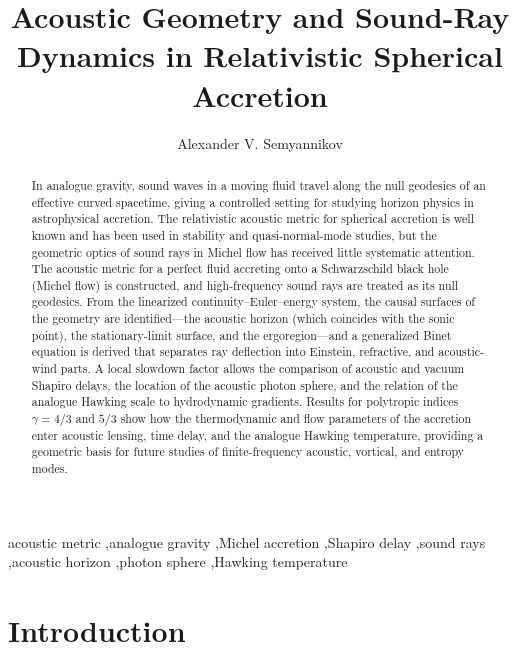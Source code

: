 \documentclass[12pt,a4paper,preprint]{elsarticle}
\begin{document}
    \begin{frontmatter}
        \title{Acoustic Geometry and Sound-Ray Dynamics in Relativistic Spherical Accretion}
        \author{Alexander V. Semyannikov}
        \address{Independent Researcher \\ \textit{Email: avsemyannikov@gmail.com}}
        \begin{abstract}
            In analogue gravity, sound waves in a moving fluid travel along the null geodesics of an effective curved spacetime, giving a controlled setting for studying horizon physics in astrophysical accretion. The relativistic acoustic metric for spherical accretion is well known and has been used in stability and quasi-normal-mode studies, but the geometric optics of sound rays in Michel flow has received little systematic attention. The acoustic metric for a perfect fluid accreting onto a Schwarzschild black hole (Michel flow) is constructed, and high-frequency sound rays are treated as its null geodesics. From the linearized continuity--Euler--energy system, the causal surfaces of the geometry are identified---the acoustic horizon (which coincides with the sonic point), the stationary-limit surface, and the ergoregion---and a generalized Binet equation is derived that separates ray deflection into Einstein, refractive, and acoustic-wind parts. A local slowdown factor allows the comparison of acoustic and vacuum Shapiro delays, the location of the acoustic photon sphere, and the relation of the analogue Hawking scale to hydrodynamic gradients. Results for polytropic indices $\gamma=4/3$ and $5/3$ show how the thermodynamic and flow parameters of the accretion enter acoustic lensing, time delay, and the analogue Hawking temperature, providing a geometric basis for future studies of finite-frequency acoustic, vortical, and entropy modes.
        \end{abstract}
        \begin{keyword}
            acoustic metric \sep analogue gravity \sep Michel accretion \sep Shapiro delay \sep sound rays \sep acoustic horizon \sep photon sphere \sep Hawking temperature
        \end{keyword}
    \end{frontmatter}

    \section{Introduction}\label{sec:introduction}
\end{document}
